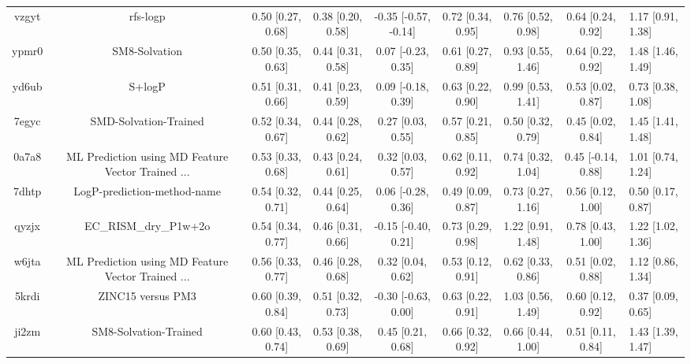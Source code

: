 \documentclass{article}
\begin{document}
\begin{center}
\begin{longtable}{|cccccccc|}
 vzgyt &                                           rfs-logp &  0.50 [0.27, 0.68] &  0.38 [0.20, 0.58] &  -0.35 [-0.57, -0.14] &  0.72 [0.34, 0.95] &    0.76 [0.52, 0.98] &    0.64 [0.24, 0.92] &     1.17 [0.91, 1.38] \\
 ypmr0 &                                      SM8-Solvation &  0.50 [0.35, 0.63] &  0.44 [0.31, 0.58] &    0.07 [-0.23, 0.35] &  0.61 [0.27, 0.89] &    0.93 [0.55, 1.46] &    0.64 [0.22, 0.92] &     1.48 [1.46, 1.49] \\
 yd6ub &                                             S+logP &  0.51 [0.31, 0.66] &  0.41 [0.23, 0.59] &    0.09 [-0.18, 0.39] &  0.63 [0.22, 0.90] &    0.99 [0.53, 1.41] &    0.53 [0.02, 0.87] &     0.73 [0.38, 1.08] \\
 7egyc &                              SMD-Solvation-Trained &  0.52 [0.34, 0.67] &  0.44 [0.28, 0.62] &     0.27 [0.03, 0.55] &  0.57 [0.21, 0.85] &    0.50 [0.32, 0.79] &    0.45 [0.02, 0.84] &     1.45 [1.41, 1.48] \\
 0a7a8 &  ML Prediction using MD Feature Vector Trained ... &  0.53 [0.33, 0.68] &  0.43 [0.24, 0.61] &     0.32 [0.03, 0.57] &  0.62 [0.11, 0.92] &    0.74 [0.32, 1.04] &   0.45 [-0.14, 0.88] &     1.01 [0.74, 1.24] \\
 7dhtp &                        LogP-prediction-method-name &  0.54 [0.32, 0.71] &  0.44 [0.25, 0.64] &    0.06 [-0.28, 0.36] &  0.49 [0.09, 0.87] &    0.73 [0.27, 1.16] &    0.56 [0.12, 1.00] &     0.50 [0.17, 0.87] \\
 qyzjx &                              EC\_RISM\_dry\_P1w+2o &  0.54 [0.34, 0.77] &  0.46 [0.31, 0.66] &   -0.15 [-0.40, 0.21] &  0.73 [0.29, 0.98] &    1.22 [0.91, 1.48] &    0.78 [0.43, 1.00] &     1.22 [1.02, 1.36] \\
 w6jta &  ML Prediction using MD Feature Vector Trained ... &  0.56 [0.33, 0.77] &  0.46 [0.28, 0.68] &     0.32 [0.04, 0.62] &  0.53 [0.12, 0.91] &    0.62 [0.33, 0.86] &    0.51 [0.02, 0.88] &     1.12 [0.86, 1.34] \\
 5krdi &                                  ZINC15 versus PM3 &  0.60 [0.39, 0.84] &  0.51 [0.32, 0.73] &   -0.30 [-0.63, 0.00] &  0.63 [0.22, 0.91] &    1.03 [0.56, 1.49] &    0.60 [0.12, 0.92] &     0.37 [0.09, 0.65] \\
 ji2zm &                              SM8-Solvation-Trained &  0.60 [0.43, 0.74] &  0.53 [0.38, 0.69] &     0.45 [0.21, 0.68] &  0.66 [0.32, 0.92] &    0.66 [0.44, 1.00] &    0.51 [0.11, 0.84] &     1.43 [1.39, 1.47] \\

\end{longtable}
\end{center}
\end{document}
